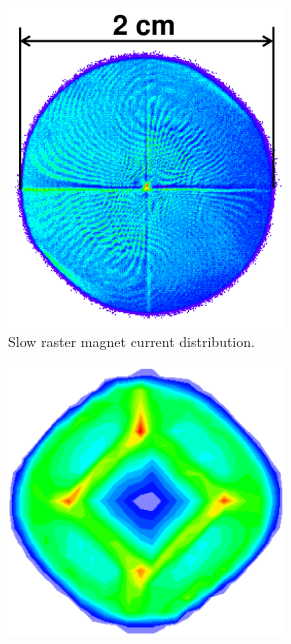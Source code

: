 \begin{figure}[tb!]
  \centering
  \begin{subfigure}[t]{0.25\textwidth}
    \centering
    \includegraphics[width=0.8\textwidth]{figs/slow-raster-pattern.png}
    \caption{Slow raster magnet current distribution. \label{C5S2SS5F2a}}
  \end{subfigure}
  \qquad
  \begin{subfigure}[t]{0.25\textwidth}
    \centering
    \includegraphics[width=0.8\textwidth]{figs/slow-raster-pattern-data-bad.png}

\end{subfigure}
\end{figure}
